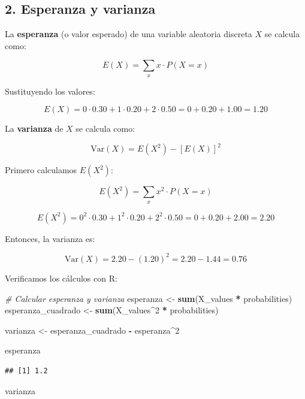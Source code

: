 \documentclass[
]{article}
\newenvironment{Shaded}{\begin{snugshade}}{\end{snugshade}}
\newcommand{\CommentTok}[1]{\textcolor[rgb]{0.56,0.35,0.01}{\textit{#1}}}
\newcommand{\DecValTok}[1]{\textcolor[rgb]{0.00,0.00,0.81}{#1}}
\newcommand{\FunctionTok}[1]{\textcolor[rgb]{0.13,0.29,0.53}{\textbf{#1}}}
\newcommand{\NormalTok}[1]{#1}
\newcommand{\OtherTok}[1]{\textcolor[rgb]{0.56,0.35,0.01}{#1}}
\newcommand{\SpecialCharTok}[1]{\textcolor[rgb]{0.81,0.36,0.00}{\textbf{#1}}}
\begin{document}
\subsection{2. Esperanza y varianza}\label{esperanza-y-varianza}

La \textbf{esperanza} (o valor esperado) de una variable aleatoria discreta \(X\) se calcula como:

\[
E(X) = \sum_{x} x \cdot P(X = x)
\]

Sustituyendo los valores:

\[
E(X) = 0 \cdot 0.30 + 1 \cdot 0.20 + 2 \cdot 0.50 = 0 + 0.20 + 1.00 = 1.20
\]

La \textbf{varianza} de \(X\) se calcula como:

\[
\text{Var}(X) = E(X^2) - [E(X)]^2
\]

Primero calculamos \(E(X^2)\):

\[
E(X^2) = \sum_{x} x^2 \cdot P(X = x)
\]

\[
E(X^2) = 0^2 \cdot 0.30 + 1^2 \cdot 0.20 + 2^2 \cdot 0.50 = 0 + 0.20 + 2.00 = 2.20
\]

Entonces, la varianza es:

\[
\text{Var}(X) = 2.20 - (1.20)^2 = 2.20 - 1.44 = 0.76
\]

Verificamos los cálculos con R:

\begin{Shaded}
\begin{Highlighting}[]
\CommentTok{\# Calcular esperanza y varianza}
\NormalTok{esperanza }\OtherTok{\textless{}{-}} \FunctionTok{sum}\NormalTok{(X\_values }\SpecialCharTok{*}\NormalTok{ probabilities)}
\NormalTok{esperanza\_cuadrado }\OtherTok{\textless{}{-}} \FunctionTok{sum}\NormalTok{(X\_values}\SpecialCharTok{\^{}}\DecValTok{2} \SpecialCharTok{*}\NormalTok{ probabilities)}

\NormalTok{varianza }\OtherTok{\textless{}{-}}\NormalTok{ esperanza\_cuadrado }\SpecialCharTok{{-}}\NormalTok{ esperanza}\SpecialCharTok{\^{}}\DecValTok{2}

\NormalTok{esperanza}
\end{Highlighting}
\end{Shaded}

\begin{verbatim}
## [1] 1.2
\end{verbatim}

\begin{Shaded}
\begin{Highlighting}[]
\NormalTok{varianza}
\end{Highlighting}
\end{Shaded}
\end{document}
